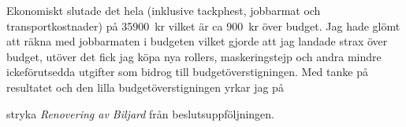 \documentclass[../_main/handlingar.tex]{subfiles}
\begin{document}
Ekonomiskt slutade det hela (inklusive tackphest, jobbarmat och transportkostnader) på
\SI{35900}{kr} vilket är ca \SI{900}{kr} över budget. Jag hade glömt att räkna med jobbarmaten i budgeten
vilket gjorde att jag landade strax över budget, utöver det fick jag köpa nya rollers,
maskeringstejp och andra mindre ickeförutsedda utgifter som bidrog till
budgetöverstigningen. Med tanke på resultatet och den lilla budgetöverstigningen yrkar jag
på

\begin{attsatser}
    \att stryka \emph{Renovering av Biljard} från beslutsuppföljningen.
\end{attsatser}

\begin{signatures}{1}
    \signature{Adam Belfrage}{}
\end{signatures}
\end{document}
